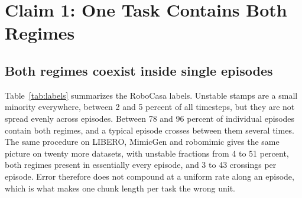 
\section{Claim 1: One Task Contains Both Regimes}
\label{sec:claim1}

\subsection{Both regimes coexist inside single episodes}

Table~\ref{tab:labels} summarizes the RoboCasa labels. Unstable stamps are a
small minority everywhere, between 2 and 5 percent of all timesteps, but they
are not spread evenly across episodes. Between 78 and 96 percent of individual
episodes contain both regimes, and a typical episode crosses between them
several times. The same procedure on LIBERO, MimicGen and robomimic gives the
same picture on twenty more datasets, with unstable fractions from 4 to 51
percent, both regimes present in essentially every episode, and 3 to 43
crossings per episode. Error therefore does not compound at a uniform rate
along an episode, which is what makes one chunk length per task the wrong unit.

